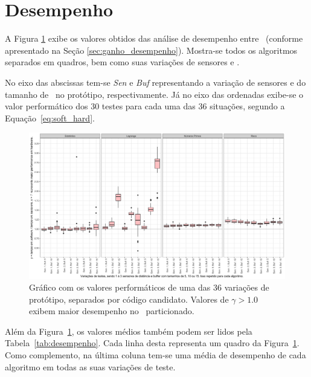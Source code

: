            

    \section{Desempenho}
    
        A Figura \ref{fig:desempenho} exibe os valores obtidos das análise de desempenho entre \hs\ (conforme apresentado na Seção \ref{sec:ganho_desempenho}).
        Mostra-se todos os algoritmos separados em quadros, bem como suas variações de sensores e \buffer.
        
        No eixo das abscissas tem-se \textit{Sen} e \textit{Buf} representando a variação de sensores e do tamanho de \buffer\ no protótipo, respectivamente.
        Já no eixo das ordenadas exibe-se o valor performático dos 30 testes para cada uma das 36 situações, segundo a Equação~\ref{eq:soft_hard}.
        
        \begin{figure}[h] \centering
            \vspace{-0.5em}
            \includegraphics[width=1\textwidth]{img/performance.png}
            \caption{Gráfico com os valores performáticos de uma das 36 variações de protótipo, separados por código candidato. Valores de $\gamma > 1.0 $ exibem maior desempenho no \hardware\ particionado.}
            \label{fig:desempenho}
        \end{figure}
   
    
        Além da Figura~\ref{fig:desempenho}, os valores médios também podem ser lidos pela Tabela~\ref{tab:desempenho}.
        Cada linha desta representa um quadro da Figura~\ref{fig:desempenho}.
        Como complemento, na última coluna tem-se uma média de desempenho de cada algoritmo em todas as suas variações de teste.
        
